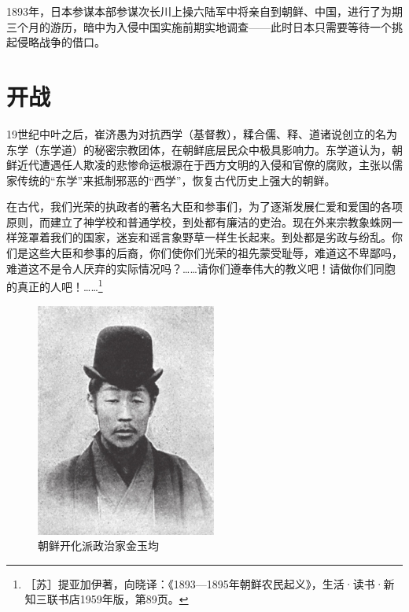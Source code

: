 \documentclass[12pt,UTF8]{ctexbook}
\begin{document}
1893年，日本参谋本部参谋次长川上操六陆军中将亲自到朝鲜、中国，进行了为期三个月的游历，暗中为入侵中国实施前期实地调查——此时日本只需要等待一个挑起侵略战争的借口。

\section{开战}

19世纪中叶之后，崔济愚为对抗西学（基督教），糅合儒、释、道诸说创立的名为东学（东学道）的秘密宗教团体，在朝鲜底层民众中极具影响力。东学道认为，朝鲜近代遭遇任人欺凌的悲惨命运根源在于西方文明的入侵和官僚的腐败，主张以儒家传统的“东学”来抵制邪恶的“西学”，恢复古代历史上强大的朝鲜。

在古代，我们光荣的执政者的著名大臣和参事们，为了逐渐发展仁爱和爱国的各项原则，而建立了神学校和普通学校，到处都有廉洁的吏治。现在外来宗教象蛛网一样笼罩着我们的国家，迷妄和谣言象野草一样生长起来。到处都是劣政与纷乱。你们是这些大臣和参事的后裔，你们使你们光荣的祖先蒙受耻辱，难道这不卑鄙吗，难道这不是令人厌弃的实际情况吗？……请你们遵奉伟大的教义吧！请做你们同胞的真正的人吧！……\footnote{［苏］提亚加伊著，向晓译：《1893—1895年朝鲜农民起义》，生活·读书·新知三联书店1959年版，第89页。}

\begin{figure}[htbp]
	\centering
	\includegraphics[width=0.7\linewidth]{6}
	\caption{朝鲜开化派政治家金玉均}
	\label{fig:1}
\end{figure}
\end{document}
